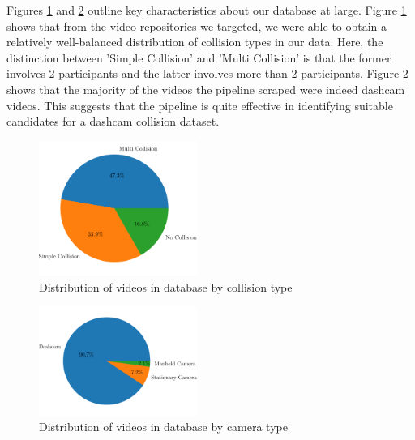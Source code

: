 \documentclass[letterpaper, 10 pt, conference]{ieeeconf}
\begin{document}
Figures \ref{fig:vids-by-collision} and \ref{fig:vids-by-camera} outline key characteristics about our database at large. Figure \ref{fig:vids-by-collision} shows that from the video repositories we targeted, we were able to obtain a relatively well-balanced distribution of collision types in our data. Here, the distinction between 'Simple Collision' and 'Multi Collision' is that the former involves 2 participants and the latter involves more than 2 participants. Figure \ref{fig:vids-by-camera} shows that the majority of the videos the pipeline scraped were indeed dashcam videos. This suggests that the pipeline is quite effective in identifying suitable candidates for a dashcam collision dataset.

\begin{figure}[!h]
	\centering
	\includegraphics[width=0.46\textwidth,trim={0 1cm 0 0},clip]{by-collision.png}
	\caption{Distribution of videos in database by collision type}
	\label{fig:vids-by-collision}
\end{figure}

\begin{figure}[!h]
	\centering
	\includegraphics[width=0.46\textwidth,trim={0 1cm 0 1cm},clip]{by-camera.png}
	\caption{Distribution of videos in database by camera type}
	\label{fig:vids-by-camera}
\end{figure}
\end{document}
